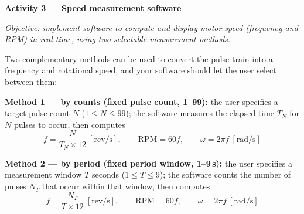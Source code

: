 \begin{procedure}
  \begin{boxedfigure}
    \centering
    \label{fig:exp7-signalpath}
  \end{boxedfigure}
  \vspace*{1.5em}

  \textbf{Activity 3 --- Speed measurement software}\vspace{2pt}

  \textit{Objective: implement software to compute and display motor speed (frequency and RPM) in real time, using two selectable measurement methods.}

  Two complementary methods can be used to convert the pulse train into a frequency and rotational speed, and your software should let the user select between them:
  \vspace*{1.5em}

  \textbf{Method 1 --- by counts (fixed pulse count, 1--99):} the user specifies a target pulse count $N$ ($1 \leq N \leq 99$); the software measures the elapsed time $T_N$ for $N$ pulses to occur, then computes
  \[
    f = \frac{N}{T_N \times 12} \ \left[\text{rev/s}\right], \qquad
    \text{RPM} = 60f, \qquad
    \omega = 2\pi f \ \left[\text{rad/s}\right]
  \]

  \textbf{Method 2 --- by period (fixed period window, 1--9\,s):} the user specifies a measurement window $T$ seconds ($1 \leq T \leq 9$); the software counts the number of pulses $N_T$ that occur within that window, then computes
  \[
    f = \frac{N_T}{T \times 12} \ \left[\text{rev/s}\right], \qquad
    \text{RPM} = 60f, \qquad
    \omega = 2\pi f \ \left[\text{rad/s}\right]
  \]
  \newpage


\end{procedure}
